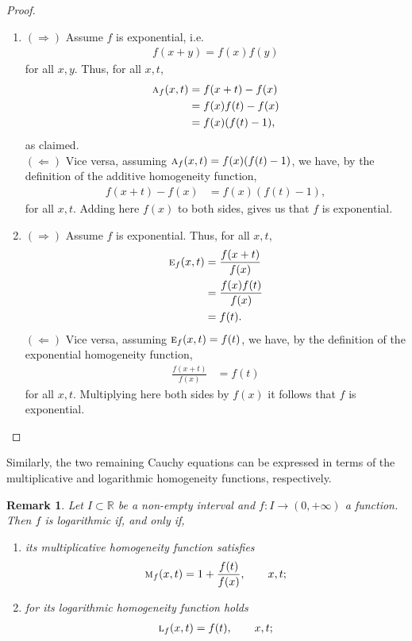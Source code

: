 \documentclass{amsart}
\theoremstyle{plain}
\newtheorem{remark}{Remark}
\numberwithin{equation}{section}
\newcommand{\eh}{\textsc{e}}
\newcommand{\R}{{\mathbb{R}}}
\begin{document}
\begin{proof}
    \begin{enumerate}
    \item
   \textbf{$(\Rightarrow)$} 
    Assume $f$ is exponential, i.e.
\begin{align*}
f(x+y)= f(x)  f(y)  
\end{align*}
for all $x,y$.
 Thus, for all $x,t$,
\begin{align*}
\textsc{a}_f (x,t) &= f(x+t)-f(x)\\
&=
f(x)f(t)-f(x) \\
&=
f(x) (f(t)-1),
\end{align*}
as claimed. \\
\textbf{$(\Leftarrow)$} Vice versa, assuming $\textsc{a}_f (x,t)= f(x) (f(t)-1)$, we have, by the definition of the additive homogeneity function,
\begin{align*}
f(x+t)-f(x)
&=
f(x) (f(t)-1),
\end{align*}
for all $x,t$. 
Adding here $f(x)$ to both sides,
gives us that $f$ is exponential.
\item
 \textbf{$(\Rightarrow)$} 
    Assume $f$ is exponential.
Thus, for all $x,t$,
\begin{align*}
\eh_f (x,t) &= \frac{f(x+t)}{f(x)}\\
&=
\frac{f(x) f(t)}{f(x)} \\
&=
f(t).
\end{align*}
\textbf{$(\Leftarrow)$}  Vice versa, assuming $\eh_f (x,t)=f(t)$,
     we have, by the definition of the exponential homogeneity function,
\begin{align*}
\frac{f(x+t)}{f(x)}
&=
f(t)
\end{align*}
for all $x,t$.
Multiplying here both sides by $f(x)$ it follows that $f$ is exponential.
\end{enumerate}
\end{proof}
%
Similarly, the two remaining Cauchy equations can be expressed in terms of the multiplicative and logarithmic homogeneity functions, respectively.


\begin{remark}
Let $I \subset \R$ be a non-empty interval and
$f: I \to (0, + \infty)$ a function.
Then $f$ is logarithmic if, and only if,
\begin{enumerate}
    \item 
its multiplicative homogeneity function satisfies
\begin{align*}
\textsc{m}_f (x,t) =1+ \frac{f(t)}{f(x)}, \qquad x,t;   
\end{align*}

\item 
for its logarithmic homogeneity function holds
\begin{align*}
\textsc{l}_f (x,t) = f(t), \qquad x,t;   
\end{align*}
\end{enumerate}
\end{remark}
\end{document}
